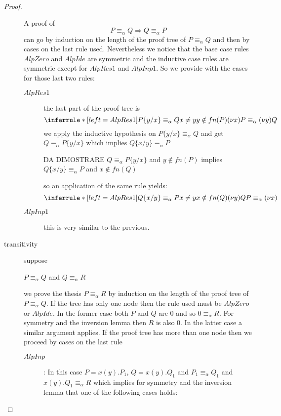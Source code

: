 \begin{lemma}
\begin{proof}
\begin{description}
	A proof of 
	\[
	  P\equiv_{\alpha}Q\Rightarrow Q\equiv_{\alpha}P
	\]
	can go by induction on the length of the proof tree of $P\equiv_{\alpha}Q$ and then by cases on the last rule used. Nevertheless we notice that the base case rules $AlpZero$ and $AlpIde$ are symmetric and the inductive case rules are symmetric except for $AlpRes1$ and $AlpInp1$. So we provide with the cases for those last two rules:
	\begin{description}
	  \item[$AlpRes1$]
	    the last part of the proof tree is
	    \[\inferrule*[left=AlpRes1]{
		P\{y/x\}\equiv_{\alpha}Q
	      \\
		x\neq y
	      \\
		y\notin fn(P)
	    }{
	      (\nu x)P\equiv_{\alpha}(\nu y)Q
	    }\]
	    we apply the inductive hypothesis on $P\{y/x\}\equiv_{\alpha}Q$ and get $Q\equiv_{\alpha}P\{y/x\}$ which implies $Q\{x/y\}\equiv_{\alpha}P$
	    \begin{center}
	      DA DIMOSTRARE
	      $Q\equiv_{\alpha}P\{y/x\}$ and $y\notin fn(P)$ implies $Q\{x/y\}\equiv_{\alpha}P$ and $x\notin fn(Q)$
	    \end{center}
	    so an application of the same rule yields:
	    \[\inferrule*[left=AlpRes1]{
		Q\{x/y\}\equiv_{\alpha}P
	      \\
		x\neq y
	      \\
		x\notin fn(Q)
	    }{
	      (\nu y)QP\equiv_{\alpha}(\nu x)
	    }\]
	  \item[$AlpInp1$]
	    this is very similar to the previous.
	\end{description}
      \item[transitivity]
	suppose 
	\begin{center}
	  $P\equiv_{\alpha}Q$ and $Q\equiv_{\alpha}R$
	\end{center}
	we prove the thesis $P\equiv_{\alpha}R$ by induction on the length of the proof tree of $P\equiv_{\alpha}Q$. If the tree has only one node then the rule used must be $AlpZero$ or $AlpIde$. In the former case both $P$ and $Q$ are $0$ and so $0\equiv_{\alpha}R$. For symmetry and the inversion lemma then $R$ is also $0$. In the latter case a similar argument applies. If the proof tree has more than one node then we proceed by cases on the last rule
	\begin{description}
	  \item[$AlpInp$]:
	    In this case $P=x(y).P_{1}$, $Q=x(y).Q_{1}$ and $P_{1}\equiv_{\alpha}Q_{1}$ and $x(y).Q_{1}\equiv_{\alpha}R$ which implies for symmetry and the inversion lemma that one of the following cases holds:

\end{description}
\end{description}
\end{proof}
\end{lemma}
